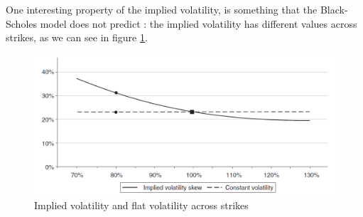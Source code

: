\documentclass[hidelinks]{article}
\theoremstyle{definition}
\begin{document}
One interesting property of the implied volatility, is something that the Black-Scholes model does not predict : the implied volatility has different values across strikes, as we can see in figure \ref{fig:skew}.

\begin{figure}[!h]
	\centering
	\includegraphics[width=\textwidth]{skew.png}
    \caption{Implied volatility and flat volatility across strikes}
    \label{fig:skew}
    \end{figure}
\end{document}
